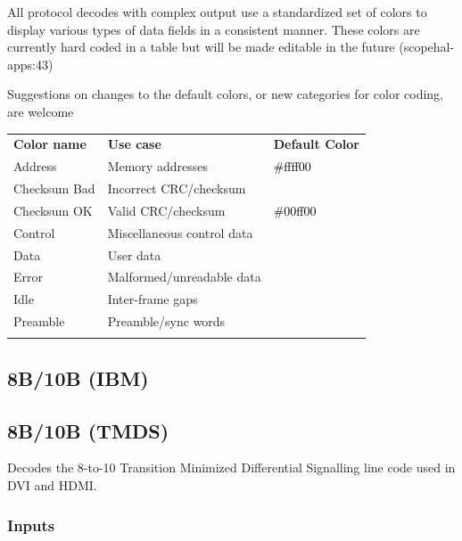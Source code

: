 \documentclass[11pt]{article}
\newcommand{\thickhline}{\Xhline{2.5\arrayrulewidth}}
\begin{document}
All protocol decodes with complex output use a standardized set of colors to display various types of data fields in a
consistent manner. These colors are currently hard coded in a table but will be made editable in the future
(scopehal-apps:43)

Suggestions on changes to the default colors, or new categories for color coding, are welcome

\begin{tabularx}{16cm}{llX}
\thickhline
\textbf{Color name} & \textbf{Use case} & \textbf{Default Color} \\
\thickhline
Address & Memory addresses & \cellcolor{address}\textcolor{black}{\#ffff00} \\
\thickhline
Checksum Bad & Incorrect CRC/checksum & \cellcolor{checksumbad}\textcolor{white}{\#ff0000} \\
\thickhline
Checksum OK & Valid CRC/checksum & \cellcolor{checksumok}\textcolor{black}{\#00ff00} \\
\thickhline
Control & Miscellaneous control data & \cellcolor{control}\textcolor{white}{\#c000a0} \\
\thickhline
Data & User data & \cellcolor{data}\textcolor{white}{\#336699} \\
\thickhline
Error & Malformed/unreadable data & \cellcolor{error}\textcolor{white}{\#ff0000} \\
\thickhline
Idle & Inter-frame gaps & \cellcolor{idle}\textcolor{white}{\#404040} \\
\thickhline
Preamble & Preamble/sync words & \cellcolor{preamble}\textcolor{white}{\#808080} \\
\thickhline
\end{tabularx}

\subsection{8B/10B (IBM)}

\subsection{8B/10B (TMDS)}

Decodes the 8-to-10 Transition Minimized Differential Signalling line code used in DVI and HDMI.

\subsubsection{Inputs}
\end{document}
